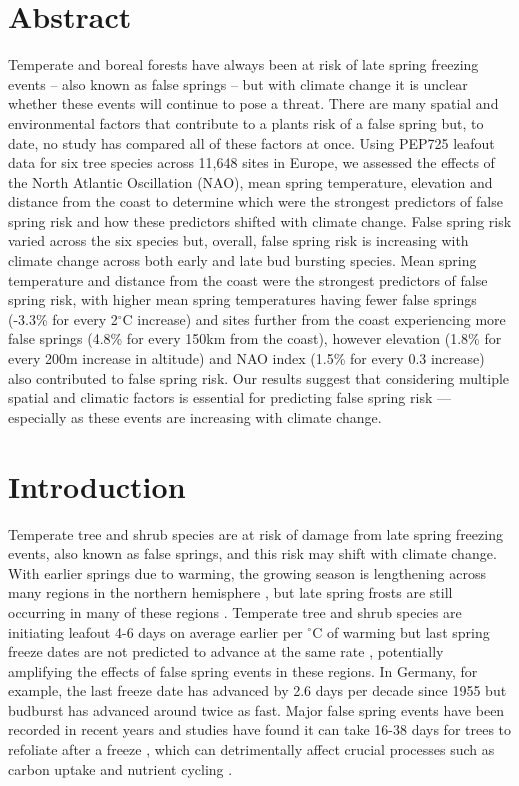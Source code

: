 \documentclass{article}\usepackage[]{graphicx}\usepackage[]{color}
\begin{document}
\section*{Abstract}
Temperate and boreal forests have always been at risk of late spring freezing events -- also known as false springs -- but with climate change it is unclear whether these events will continue to pose a threat. There are many spatial and environmental factors that contribute to a plants risk of a false spring but, to date, no study has compared all of these factors at once. Using PEP725 leafout data for six tree species across 11,648 sites in Europe, we assessed the effects of the North Atlantic Oscillation (NAO), mean spring temperature, elevation and distance from the coast to determine which were the strongest predictors of false spring risk and how these predictors shifted with climate change. False spring risk varied across the six species but, overall, false spring risk is increasing with climate change across both early and late bud bursting species. Mean spring temperature and distance from the coast were the strongest predictors of false spring risk, with higher mean spring temperatures having fewer false springs (-3.3\% for every 2$^{\circ}$C increase) and sites further from the coast experiencing more false springs (4.8\% for every 150km from the coast), however elevation (1.8\% for every 200m increase in altitude) and NAO index (1.5\% for every 0.3 increase) also contributed to false spring risk. Our results suggest that considering multiple spatial and climatic factors is essential for predicting false spring risk --- especially as these events are increasing with climate change.

\section*{Introduction}
Temperate tree and shrub species are at risk of damage from late spring freezing events, also known as false springs, and this risk may shift with climate change. With earlier springs due to warming, the growing season is lengthening across many regions in the northern hemisphere \citep{Chen2005, Kukal2018, Liu2006}, but late spring frosts are still occurring in many of these regions \citep{Wypych2016a}. Temperate tree and shrub species are initiating leafout 4-6 days on average earlier per $^{\circ}$C of warming \citep{IPCC2014, Wolkovich2012} but last spring freeze dates are not predicted to advance at the same rate \citep{Inouye2008, Labe2016, Martin2010, Sgubin2018}, potentially amplifying the effects of false spring events in these regions. In Germany, for example, the last freeze date has advanced by 2.6 days per decade since 1955 \citep{Zohner2016} but budburst has advanced around twice as fast. Major false spring events have been recorded in recent years and studies have found it can take 16-38 days for trees to refoliate after a freeze \citep{Augspurger2009, Augspurger2013, Gu2008, Menzel2015}, which can detrimentally affect crucial processes such as carbon uptake and nutrient cycling \citep{Hufkens2012, Klosterman2018, Richardson2013}.
\end{document}
